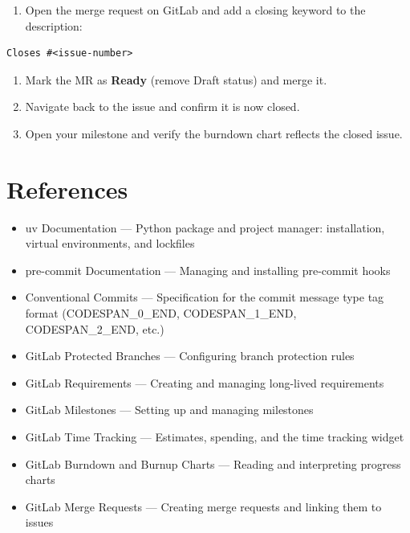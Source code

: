 \documentclass[11pt,a4paper]{book}
\begin{document}
\begin{enumerate}
  \item Open the merge request on GitLab and add a closing keyword to the description:
\end{enumerate}

\begin{lstlisting}
Closes #<issue-number>
\end{lstlisting}

\begin{enumerate}
  \item Mark the MR as \textbf{Ready} (remove Draft status) and merge it.
  \item Navigate back to the issue and confirm it is now closed.
  \item Open your milestone and verify the burndown chart reflects the closed issue.
\end{enumerate}

\medskip

\section{References}

\begin{itemize}
  \item uv Documentation --- Python package and project manager: installation, virtual environments, and lockfiles
  \item pre-commit Documentation --- Managing and installing pre-commit hooks
  \item Conventional Commits --- Specification for the commit message type tag format (CODESPAN\_0\_END, CODESPAN\_1\_END, CODESPAN\_2\_END, etc.)
  \item GitLab Protected Branches --- Configuring branch protection rules
  \item GitLab Requirements --- Creating and managing long-lived requirements
  \item GitLab Milestones --- Setting up and managing milestones
  \item GitLab Time Tracking --- Estimates, spending, and the time tracking widget
  \item GitLab Burndown and Burnup Charts --- Reading and interpreting progress charts
  \item GitLab Merge Requests --- Creating merge requests and linking them to issues
\end{itemize}

\end{document}
